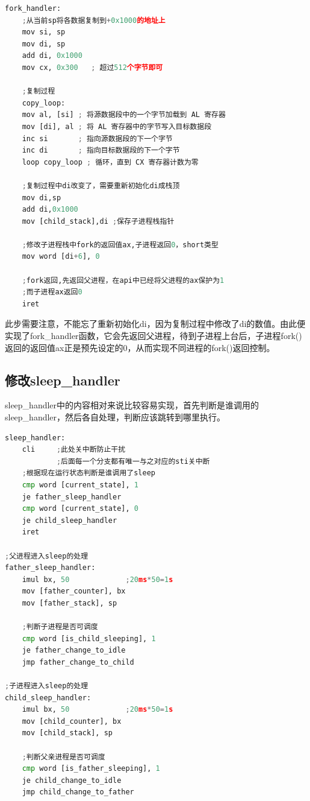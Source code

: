 \documentclass{LabReport}
\begin{document}
	\begin{lstlisting}[language=python,frame=shadowbox]
fork_handler:
	;从当前sp将各数据复制到+0x1000的地址上
	mov si, sp
	mov di, sp
	add di, 0x1000
	mov cx, 0x300   ; 超过512个字节即可

	;复制过程
	copy_loop:
	mov al, [si] ; 将源数据段中的一个字节加载到 AL 寄存器
	mov [di], al ; 将 AL 寄存器中的字节写入目标数据段
	inc si       ; 指向源数据段的下一个字节
	inc di       ; 指向目标数据段的下一个字节
	loop copy_loop ; 循环，直到 CX 寄存器计数为零

	;复制过程中di改变了，需要重新初始化di成栈顶
	mov di,sp
	add di,0x1000
	mov [child_stack],di ;保存子进程栈指针

	;修改子进程栈中fork的返回值ax,子进程返回0，short类型
	mov word [di+6], 0 
	
	;fork返回,先返回父进程，在api中已经将父进程的ax保护为1
	;而子进程ax返回0
	iret 
	\end{lstlisting}
	此步需要注意，不能忘了重新初始化di，因为复制过程中修改了di的数值。由此便实现了fork\_handler函数，它会先返回父进程，待到子进程上台后，子进程fork()返回的返回值ax正是预先设定的0，从而实现不同进程的fork()返回控制。
	

	\subsection{修改sleep\_handler}
	sleep\_handler中的内容相对来说比较容易实现，首先判断是谁调用的sleep\_handler，然后各自处理，判断应该跳转到哪里执行。
	
	\begin{lstlisting}[language=python,frame=shadowbox]
sleep_handler:
	cli     ;此处关中断防止干扰
			;后面每一个分支都有唯一与之对应的sti关中断
	;根据现在运行状态判断是谁调用了sleep
	cmp word [current_state], 1
	je father_sleep_handler
	cmp word [current_state], 0
	je child_sleep_handler
	iret

;父进程进入sleep的处理
father_sleep_handler:   
	imul bx, 50             ;20ms*50=1s
	mov [father_counter], bx
	mov [father_stack], sp

	;判断子进程是否可调度
	cmp word [is_child_sleeping], 1
	je father_change_to_idle
	jmp father_change_to_child

;子进程进入sleep的处理
child_sleep_handler:
	imul bx, 50             ;20ms*50=1s
	mov [child_counter], bx
	mov [child_stack], sp

	;判断父亲进程是否可调度
	cmp word [is_father_sleeping], 1
	je child_change_to_idle
	jmp child_change_to_father
	\end{lstlisting}
	
\end{document}

